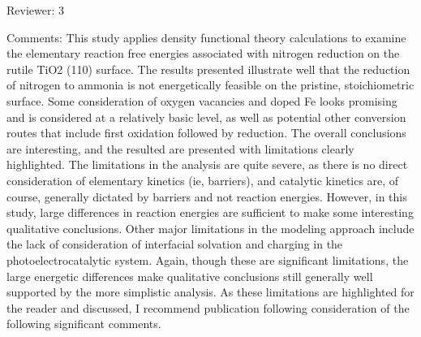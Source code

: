 

Reviewer: 3

Comments:
This study applies density functional theory calculations to examine the elementary reaction free energies associated with nitrogen reduction on the rutile TiO2 (110) surface.  The results presented illustrate well that the reduction of nitrogen to ammonia is not energetically feasible on the pristine, stoichiometric surface.  Some consideration of oxygen vacancies and doped Fe looks promising and is considered at a relatively basic level, as well as potential other conversion routes that include first oxidation followed by reduction.  The overall conclusions are interesting, and the resulted are presented with limitations clearly highlighted.  The limitations in the analysis are quite severe, as there is no direct consideration of elementary kinetics (ie, barriers), and catalytic kinetics are, of course, generally dictated by barriers and not reaction energies.  However, in this study, large differences in reaction energies are sufficient to make some interesting qualitative conclusions.  Other major limitations in the modeling approach include the lack of consideration of interfacial solvation and charging in the photoelectrocatalytic system.  Again, though these are significant limitations, the large energetic differences make qualitative conclusions still generally well supported by the more simplistic analysis. As these limitations are highlighted for the reader and discussed, I recommend publication following consideration of the following significant comments.

